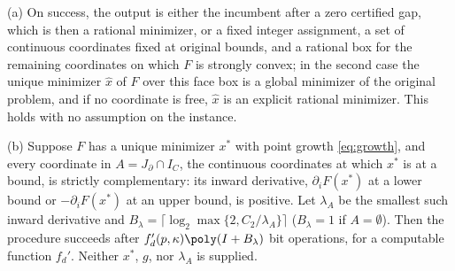 \begin{theorem}\label{thm:boundary}
(a) On success, the output is either the incumbent after a zero certified
gap, which is then a rational minimizer, or a fixed integer assignment, a set
of continuous coordinates fixed at original bounds, and a rational box for the
remaining coordinates on which $F$ is strongly convex; in the second case the
unique minimizer $\hat x$ of $F$ over this face box is a global minimizer of
the original problem, and if no coordinate is free, $\hat x$ is an explicit
rational minimizer. This holds with no assumption on the instance.

(b) Suppose $F$ has a unique minimizer $x^*$ with point growth
\eqref{eq:growth}, and every coordinate in $A=J_\partial\cap I_C$, the
continuous coordinates at which $x^*$ is at a bound, is strictly complementary:
its inward derivative, $\partial_iF(x^*)$ at a lower bound or
$-\partial_iF(x^*)$ at an upper bound, is positive. Let $\lambda_A$ be the
smallest such inward derivative and
$B_\lambda=\lceil\log_2\max\{2,C_2/\lambda_A\}\rceil$ ($B_\lambda=1$ if
$A=\emptyset$). Then the procedure succeeds after
$f_d'(p,\kappa)\poly(I+B_\lambda)$ bit operations, for a computable function
$f_d'$. Neither $x^*$, $g$, nor $\lambda_A$ is supplied.
\end{theorem}


